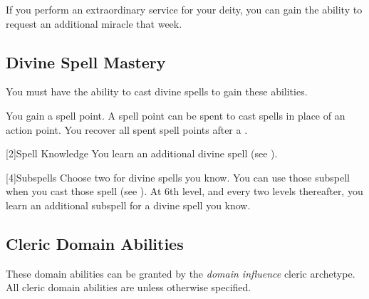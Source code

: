         If you perform an extraordinary service for your deity, you can gain the ability to request an additional miracle that week.

    \subsection{Divine Spell Mastery}
        You must have the ability to cast divine spells to gain these abilities.

        You gain a spell point.
        A spell point can be spent to cast spells in place of an action point.
        You recover all spent spell points after a .

        [2]{Spell Knowledge}
        You learn an additional divine spell (see ).

        [4]{Subspells}
        Choose two  for divine spells you know.
        You can use those subspell when you cast those spell (see ).
        At 6th level, and every two levels thereafter, you learn an additional subspell for a divine spell you know.

    \subsection{Cleric Domain Abilities}\label{Cleric Domain Abilities}
        These domain abilities can be granted by the \textit{domain influence} cleric archetype.
        All cleric domain abilities are  unless otherwise specified.

